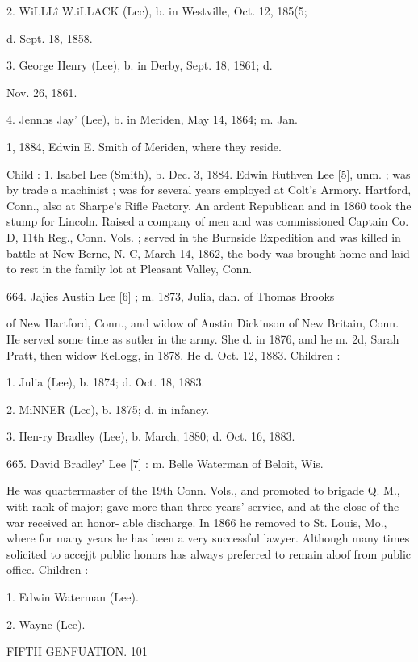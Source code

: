 \documentclass{book}
\begin{document}
2. WiLLL\^i W.iLLACK (Lcc), b. in Westville, Oct. 12, 185(5; 

d. Sept. 18, 1858. 

3. George Henry (Lee), b. in Derby, Sept. 18, 1861; d. 

Nov. 26, 1861. 

4. Jennhs Jay' (Lee), b. in Meriden, May 14, 1864; m. Jan. 

1, 1884, Edwin E. Smith of Meriden, where they reside. 

Child : 
1. Isabel Lee (Smith), b. Dec. 3, 1884. 
Edwin Ruthven Lee [5], unm. ; was by trade a machinist ; was 
for several years employed at Colt's Armory. Hartford, Conn., 
also at Sharpe's Rifle Factory. An ardent Republican and in 
1860 took the stump for Lincoln. Raised a company of men 
and was commissioned Captain Co. D, 11th Reg., Conn. Vols. ; 
served in the Burnside Expedition and was killed in battle at 
New Berne, N. C, March 14, 1862, the body was brought 
home and laid to rest in the family lot at Pleasant Valley, Conn. 

664. Jajies Austin Lee [6] ; m. 1873, Julia, dan. of Thomas Brooks 

of New Hartford, Conn., and widow of Austin Dickinson of 
New Britain, Conn. He served some time as sutler in the 
army. She d. in 1876, and he m. 2d, Sarah Pratt, then 
widow Kellogg, in 1878. He d. Oct. 12, 1883. Children : 

1. Julia (Lee), b. 1874; d. Oct. 18, 1883. 

2. MiNNER (Lee), b. 1875; d. in infancy. 

3. Hen-ry Bradley (Lee), b. March, 1880; d. Oct. 16, 1883. 

665. David Bradley' Lee [7] : m. Belle Waterman of Beloit, Wis. 

He was quartermaster of the 19th Conn. Vols., and promoted 
to brigade Q. M., with rank of major; gave more than three 
years' service, and at the close of the war received an honor- 
able discharge. In 1866 he removed to St. Louis, Mo., where 
for many years he has been a very successful lawyer. 
Although many times solicited to accejjt public honors has 
always preferred to remain aloof from public office. Children : 

1. Edwin Waterman (Lee). 

2. Wayne (Lee). 



FIFTH GENFUATION. 101 
\end{document}
